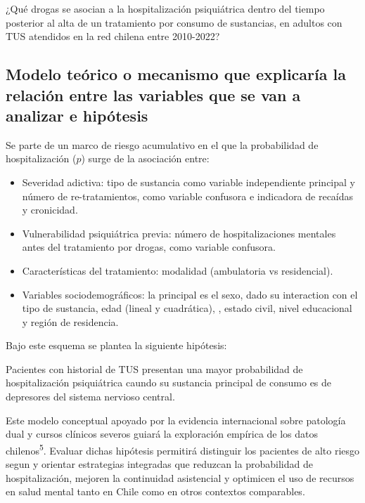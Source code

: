 \documentclass[
  spanish,
  10pt,
]{article}
\begin{document}
¿Qué drogas se asocian a la hospitalización psiquiátrica dentro del
tiempo posterior al alta de un tratamiento por consumo de sustancias, en
adultos con TUS atendidos en la red chilena entre 2010-2022?

\subsection{Modelo teórico o mecanismo que explicaría la relación entre
las variables que se van a analizar e
hipótesis}\label{modelo-teuxf3rico-o-mecanismo-que-explicaruxeda-la-relaciuxf3n-entre-las-variables-que-se-van-a-analizar-e-hipuxf3tesis}

Se parte de un marco de riesgo acumulativo en el que la probabilidad de
hospitalización (\(p\)) surge de la asociación entre:

\begin{itemize}
\item
  Severidad adictiva: tipo de sustancia como variable independiente
  principal y número de re-tratamientos, como variable confusora e
  indicadora de recaídas y cronicidad.
\item
  Vulnerabilidad psiquiátrica previa: número de hospitalizaciones
  mentales antes del tratamiento por drogas, como variable confusora.
\item
  Características del tratamiento: modalidad (ambulatoria vs
  residencial).
\item
  Variables sociodemográficos: la principal es el sexo, dado su
  interaction con el tipo de sustancia, edad (lineal y cuadrática), ,
  estado civil, nivel educacional y región de residencia.
\end{itemize}

Bajo este esquema se plantea la siguiente hipótesis:

Pacientes con historial de TUS presentan una mayor probabilidad de
hospitalización psiquiátrica caundo su sustancia principal de consumo es
de depresores del sistema nervioso central.

Este modelo conceptual apoyado por la evidencia internacional sobre
patología dual y cursos clínicos severos guiará la exploración empírica
de los datos chilenos\textsuperscript{5}. Evaluar dichas hipótesis
permitirá distinguir los pacientes de alto riesgo segun y orientar
estrategias integradas que reduzcan la probabilidad de hospitalización,
mejoren la continuidad asistencial y optimicen el uso de recursos en
salud mental tanto en Chile como en otros contextos comparables.
\end{document}
